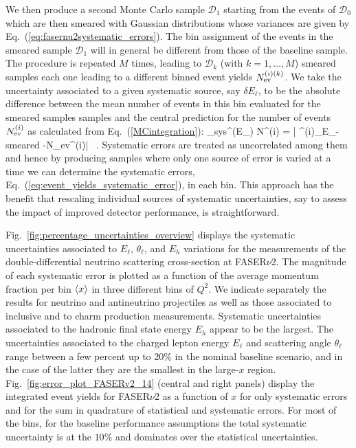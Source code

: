 We then produce a second Monte Carlo sample $\mathcal{D}_1$ starting from the events
of $\mathcal{D}_0$ which are then smeared with Gaussian distributions whose variances
are given by Eq.~(\ref{eq:fasernu2systematic_errors}).
%
The bin assignment of the events in the smeared sample $\mathcal{D}_1$ will
in general be different from those of the baseline sample.
%
The procedure is repeated $M$ times, leading to
$\mathcal{D}_k$ (with $k=1,\ldots,M$) smeared
samples each one leading to a different binned event yields
$ N_{\rm ev}^{(i)(k)}$.
%
We take the uncertainty associated
to a given systematic source, say $\delta E_\ell$,
to be the absolute difference between the mean number of events in this
bin evaluated for the smeared samples samples and the
central prediction for the number of events
$ N_{\rm ev}^{(i)}$ as calculated from Eq.~(\ref{MCintegration}):
\be
\delta_{\rm sys}^{(E_\ell)} N^{(i)} = \Big| ^{(i)}\ra_{E_\ell-{\rm smeared}} -N_{\rm ev}^{(i)}\Big| \, .
\ee
Systematic errors are treated as uncorrelated among them and hence
by producing samples where only one source of error is varied at a time
we can determine the systematic errors, Eq.~(\ref{eq:event_yields_systematic_error}), in each bin.
%
This approach has the benefit that rescaling individual sources of systematic
uncertainties, say to assess the impact of improved detector performance,
is straightforward. 

Fig.~\ref{fig:percentage_uncertainties_overview}
displays the systematic uncertainties associated
to $E_\ell$, $\theta_\ell$, and $E_h$ variations
for the  measurements
of the double-differential
neutrino scattering cross-section at FASER$\nu$2.
%
The magnitude of each systematic error is plotted as a function
of the average momentum fraction per bin $\left\langle x\right\rangle$
in three different bins of $Q^2$.
%
We indicate separately the results for neutrino and antineutrino projectiles as well as
those associated to inclusive and to charm production measurements.
%
Systematic uncertainties associated to the hadronic final state energy $E_h$ appear to be the largest.
%
The uncertainties associated to the charged lepton energy $E_\ell$ and scattering angle $\theta_\ell$ range
between a few percent up to 20\% in the nominal baseline scenario,
and in the case of the latter they are the smallest in the large-$x$ region.
%
Fig.~\ref{fig:error_plot_FASERv2_14} (central and right panels) display
 the integrated event yields for FASER$\nu$2 as a function of $x$ for only
 systematic errors and for the sum in quadrature of statistical and systematic errors.
 For most of the bins, for the baseline performance assumptions the total systematic
 uncertainty is at the $10\%$ and dominates over the statistical uncertainties.

